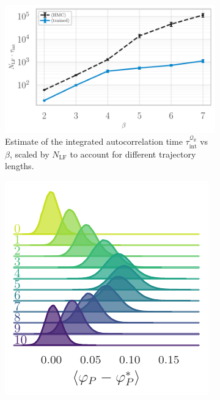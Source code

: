 \documentclass{article} %
\begin{document}
\begin{figure}[htpb]
\begin{subfigure}{0.37\textwidth}
   \end{subfigure}
   \hfill
   \begin{subfigure}{0.39\textwidth}
      \includegraphics[width=\textwidth]{figures/autocorr_vs_beta_blue_2120.pdf}
      \caption{\label{fig:autocorr_vs_beta}Estimate of the integrated autocorrelation time
      \(\tau_{\mathrm{int}}^{\mathcal{Q}_{\mathbb{R}}}\) vs \(\beta\), scaled by \(N_{\mathrm{LF}}\) to account for
   different trajectory lengths.}
   \end{subfigure}
   \hfill
   \begin{subfigure}{0.49\textwidth}
      \includegraphics[width=\textwidth]{figures/plaqsf_1758.pdf}

\end{subfigure}
\end{figure}
\end{document}
